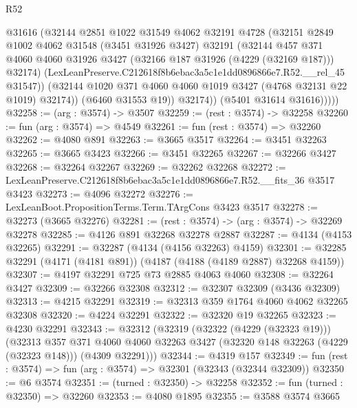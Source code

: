 \begin{lexlean}{R52}
\begin{coremodule}
                  @31616
                  (@32144
                    @2851
                    @1022
                    @31549
                    @4062
                    @32191
                    @4728
                    (@32151
                      @2849
                      @1002
                      @4062
                      @31548
                      (@3451 @31926 @3427)
                      @32191
                      (@32144
                        @457
                        @371
                        @4060
                        @4060
                        @31926
                        @3427
                        (@32166 @187 @31926 (@4229 (@32169 @187)))
                        @32174)
                      (LexLeanPreserve.C212618f8b6ebac3a5c1e1dd0896866e7.R52.__rel_45 @31547))
                    (@32144 @1020 @371 @4060 @4060 @1019 @3427 (@4768 @32131 @22 @1019) @32174))
                  (@6460 @31553 @19))
                @32174))
            (@5401 @31614 @31616)))))
@32258 := (arg : @3574) -> @3507
@32259 := (rest : @3574) -> @32258
@32260 := fun (arg : @3574) => @4549
@32261 := fun (rest : @3574) => @32260
@32262 := @4080 @891
@32263 := @3665 @3517
@32264 := @3451 @32263
@32265 := @3665 @3423
@32266 := @3451 @32265
@32267 := @32266 @3427
@32268 := @32264 @32267
@32269 := @32262 @32268
@32272 := LexLeanPreserve.C212618f8b6ebac3a5c1e1dd0896866e7.R52.__fits_36 @3517 @3423
@32273 := @4096 @32272
@32276 := LexLeanBoot.PropositionTerms.Term.TArgCons @3423 @3517
@32278 := @32273 (@3665 @32276)
@32281 := (rest : @3574) -> (arg : @3574) -> @32269 @32278
@32285 := @4126 @891 @32268 @32278 @2887
@32287 := @4134 (@4153 @32265)
@32291 := @32287 (@4134 (@4156 @32263) @4159)
@32301 := @32285 @32291 (@4171 (@4181 @891)) (@4187 (@4188 (@4189 @2887) @32268 @4159))
@32307 := @4197 @32291 @725 @73 @2885 @4063 @4060
@32308 := @32264 @3427
@32309 := @32266 @32308
@32312 := @32307 @32309 (@3436 @32309)
@32313 := @4215 @32291
@32319 := @32313 @359 @1764 @4060 @4062 @32265 @32308
@32320 := @4224 @32291
@32322 := @32320 @19 @32265
@32323 := @4230 @32291
@32343 := @32312
    (@32319
      (@32322 (@4229 (@32323 @19)))
      (@32313
        @357
        @371
        @4060
        @4060
        @32263
        @3427
        (@32320 @148 @32263 (@4229 (@32323 @148)))
        (@4309 @32291)))
@32344 := @4319 @157
@32349 := fun (rest : @3574) => fun (arg : @3574) => @32301 (@32343 (@32344 @32309))
@32350 := @6 @3574
@32351 := (turned : @32350) -> @32258
@32352 := fun (turned : @32350) => @32260
@32353 := @4080 @1895
@32355 := @3588 @3574 @3665

\end{coremodule}
\end{lexlean}
